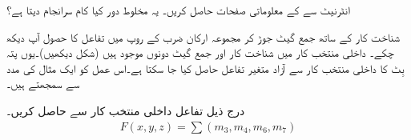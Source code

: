 انٹرنیٹ سے  کے معلوماتی صفحات حاصل کریں۔ یہ مخلوط دور کیا کام سرانجام دیتا ہے؟


 شناخت کار کے ساتھ جمع گیٹ جوڑ کر مجموعہ ارکان ضرب کے روپ میں تفاعل کا حصول آپ دیکھ چکے۔ داخلی منتخب کار میں شناخت کار اور جمع گیٹ دونوں موجود ہیں (شکل  دیکھیں)۔یوں  پتہ بِٹ کا  داخلی منتخب کار سے  آزاد متغیر تفاعل حاصل کیا جا سکتا ہے۔اس عمل کو ایک مثال کی مدد سے سمجھتے ہیں۔
 
 درج ذیل تفاعل  داخلی منتخب کار سے حاصل کریں۔
 \begin{align*}
 F(x,y,z)=\sum (m_3,m_4,m_6,m_7)
 \end{align*}

